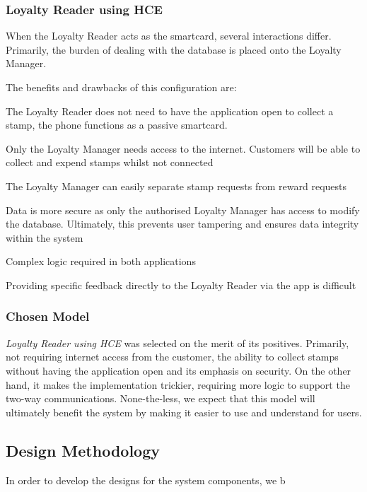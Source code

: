 \subsubsection{Loyalty Reader using HCE}
When the Loyalty Reader acts as the smartcard, several interactions differ. Primarily, the burden of dealing with the database is placed onto the Loyalty Manager.

The benefits and drawbacks of this configuration are: 
\begin{description}[leftmargin=!,labelwidth=\widthof{\bfseries small}]
    \item[+] The Loyalty Reader does not need to have the application open to collect a stamp, the phone functions as a passive smartcard.
    \item[+] Only the Loyalty Manager needs access to the internet. Customers will be able to collect and expend stamps whilst not connected
    \item[+] The Loyalty Manager can easily separate stamp requests from reward requests
    \item[+] Data is more secure as only the authorised Loyalty Manager has access to modify the database. Ultimately, this prevents user tampering and ensures data integrity within the system
    \item[---] Complex logic required in both applications
    \item[---] Providing specific feedback directly to the Loyalty Reader via the app is difficult
\end{description}

\subsubsection{Chosen Model}
\emph{Loyalty Reader using HCE} was selected on the merit of its positives. Primarily, not requiring internet access from the customer, the ability to collect stamps without having the application open and its emphasis on security. On the other hand, it makes the implementation trickier, requiring more logic to support the two-way communications. None-the-less, we expect that this model will ultimately benefit the system by making it easier to use and understand for users.

\subsection{Design Methodology}
In order to develop the designs for the system components, we b
